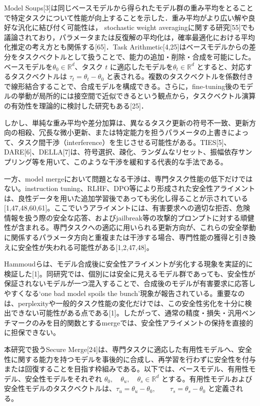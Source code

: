 \documentclass{article}
\begin{document}
Model Soups[3]は同じベースモデルから得られたモデル群の重み平均をとることで特定タスクについて性能が向上することを示した．重み平均がより広い解や良好な汎化に結び付く可能性は，
stochastic weight averagingに関する研究[55]でも議論されており，パラメータまたは反復解の平均化は，確率最適化における平均化推定の考え方とも関係する[65]．Task Arithmetic[4,25]はベースモデルからの差分をタスクベクトルとして扱うことで、能力の追加・削除・合成を可能にした。ベースモデルを\(\theta_0 \in \mathbb{R}^d\)、タスク \(t\) に適応したモデルを\(\theta_t \in \mathbb{R}^d\) とすると、対応するタスクベクトルは \(\tau_t = \theta_t - \theta_0\) と表される。複数のタスクベクトルを係数付きで線形結合することで、合成モデルを構成できる。さらに，fine-tuning後のモデルの挙動が局所的には接空間で近似できるという観点から，タスクベクトル演算の有効性を理論的に検討した研究もある[25]．
\color{black}

しかし、単純な重み平均や差分加算は、異なるタスク更新の符号不一致、更新方向の相殺、冗長な微小更新、または特定能力を担うパラメータの上書きによって、タスク間干渉（interference）を生じさせる可能性がある。TIES[5]、DARE[6]、DELLA[7]は、符号選択、疎化、ランダムなリセット、振幅依存サンプリング等を用いて、このような干渉を緩和する代表的な手法である。

一方、model mergeにおいて問題となる干渉は、専門タスク性能の低下だけではない。instruction tuning、RLHF、DPO等により形成された安全性アライメントは、良性データを用いた追加学習後であっても劣化し得ることが示されている[1,47,48,60,61]。ここでいうアライメントには、有害要求への適切な拒否、危険情報を扱う際の安全な応答、およびjailbreak等の攻撃的プロンプトに対する頑健性が含まれる。専門タスクへの適応に用いられる更新方向が、これらの安全挙動に関係するパラメータ方向と重複または干渉する場合、専門性能の獲得と引き換えに安全性が失われる可能性がある[1,2,47,48]。

Hammoudらは、モデル合成後に安全性アライメントが劣化する現象を実証的に検証した[1]。同研究では、個別には安全に見えるモデル群であっても、安全性が保証されないモデルが一つ混入することで、合成後のモデルが有害要求に応答しやすくなる`one bad model spoils the bunch'現象が報告されている。重要なのは、perplexityや一般的タスク性能の変化だけでは、この安全性劣化を十分に検出できない可能性がある点である[1]。したがって、通常の精度・損失・汎用ベンチマークのみを目的関数とするmergeでは、安全性アライメントの保持を直接的に担保できない。

本研究で扱うSecure Merge[24]は、専門タスクに適応した有用性モデルへ、安全性に関する能力を持つモデルを事後的に合成し、再学習を行わずに安全性を付与または回復することを目指す枠組みである。以下では、ベースモデル、有用性モデル、安全性モデルをそれぞれ \(\theta_0,\quad \theta_u,\quad \theta_s \in \mathbb{R}^d\) とする。有用性モデルおよび安全性モデルのタスクベクトルは、\(\tau_u = \theta_u - \theta_0,\qquad \tau_s = \theta_s - \theta_0\) と定義される。
\end{document}
